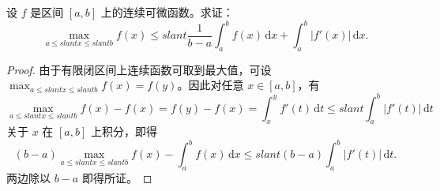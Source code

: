 \documentclass[../../main.tex]{subfiles}
\begin{document}
\begin{example}
设 \( f \) 是区间 \([a,b]\) 上的连续可微函数。求证：
\[
\max_{a\leqslant slant x\leqslant slant b} f(x)\leqslant slant \frac{1}{b-a}\int_a^b{f(x)\,\mathrm{d}x}+\int_a^b{|f\prime (x)|\,\mathrm{d}x}.
\]
\end{example}
\begin{proof}
由于有限闭区间上连续函数可取到最大值，可设 \( \max_{a \leqslant slant x \leqslant slant b} f(x) = f(y) \)。因此对任意 \( x \in [a,b] \)，有
\[
\max_{a \leqslant slant x \leqslant slant b} f(x) - f(x) = f(y) - f(x) = \int_{x}^{y} f'(t) \, \mathrm{d}t \leqslant slant \int_{a}^{b} |f'(t)| \, \mathrm{d}t
\]
关于 \( x \) 在 \([a,b]\) 上积分，即得
\[
(b - a) \max_{a \leqslant slant x \leqslant slant b} f(x) - \int_{a}^{b} f(x) \, \mathrm{d}x \leqslant slant (b-a)\int_{a}^{b} |f'(t)| \, \mathrm{d}t.
\]
两边除以 \( b - a \) 即得所证。
\end{proof}
\end{document}
